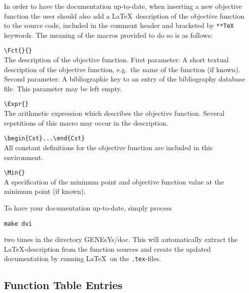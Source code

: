 In order to have the documentation up-to-date, when inserting a new 
objective function the user should also add a \LaTeX\ description of
the objective function to the source code, included in the comment 
header and bracketed by \verb/**TeX/ keywords.
The meaning of the macros provided to do so is as follows:
%
\begin{Itemize}
%
\item	\verb/\Fct{}{}/							\\
	The description of the objective function.
	First parameter: A short textual description of the objective 
	function, e.g.~the name of the function (if known).		\\
	Second parameter: A bibliographic key to an entry of the
	bibliography database file.
	This parameter may be left empty.
%
\item	\verb/\Expr{}/							\\
	The arithmetic expression which describes the objective function.
	Several repetitions of this macro may occur in the description.
%
\item	\verb/\begin{Cst}...\end{Cst}/					\\
	All constant definitions for the objective function are included
	in this environment.				
%
\item	\verb/\Min{}/							\\
	A specification of the minimum point and objective function
	value at the minimum point (if known).
%
\end{Itemize}

To have your documentation up-to-date, simply process
%
\begin{center}
	\verb/make dvi/
\end{center}
%
two times in the directory GENEsYs/doc.
This will automatically extract the \LaTeX-description from the 
function sources and create the updated documentation by running
\LaTeX\ on the \verb/.tex/-files.

\subsection{Function Table Entries}

